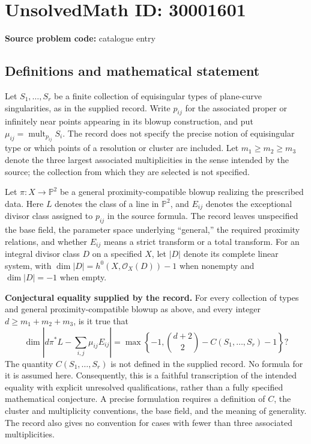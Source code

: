 \documentclass[11pt]{article}
\begin{document}
\section*{UnsolvedMath ID: 30001601}
\textbf{Source problem code:} catalogue entry
\subsection{Definitions and mathematical statement}
Let \(S_1,\ldots,S_r\) be a finite collection of equisingular types of plane-curve singularities, as in the supplied record. Write \(p_{ij}\) for the associated proper or infinitely near points appearing in its blowup construction, and put \(\mu_{ij}=\operatorname{mult}_{p_{ij}}S_i\). The record does not specify the precise notion of equisingular type or which points of a resolution or cluster are included. Let \(m_1\geq m_2\geq m_3\) denote the three largest associated multiplicities in the sense intended by the source; the collection from which they are selected is not specified.

Let \(\pi:X\to\mathbb{P}^{2}\) be a general proximity-compatible blowup realizing the prescribed data. Here \(L\) denotes the class of a line in \(\mathbb{P}^{2}\), and \(E_{ij}\) denotes the exceptional divisor class assigned to \(p_{ij}\) in the source formula. The record leaves unspecified the base field, the parameter space underlying ``general,'' the required proximity relations, and whether \(E_{ij}\) means a strict transform or a total transform. For an integral divisor class \(D\) on a specified \(X\), let \(|D|\) denote its complete linear system, with \(\dim|D|=h^0(X,\mathcal{O}_X(D))-1\) when nonempty and \(\dim|D|=-1\) when empty.

\textbf{Conjectural equality supplied by the record.} For every collection of types and general proximity-compatible blowup as above, and every integer \(d\geq m_1+m_2+m_3\), is it true that
\[
\dim\left|d\pi^{*}L-\sum_{i,j}\mu_{ij}E_{ij}\right|
=
\max\left\{-1,\binom{d+2}{2}-C(S_1,\ldots,S_r)-1\right\}?
\]
The quantity \(C(S_1,\ldots,S_r)\) is not defined in the supplied record. No formula for it is assumed here. Consequently, this is a faithful transcription of the intended equality with explicit unresolved qualifications, rather than a fully specified mathematical conjecture. A precise formulation requires a definition of \(C\), the cluster and multiplicity conventions, the base field, and the meaning of generality. The record also gives no convention for cases with fewer than three associated multiplicities.
\end{document}
